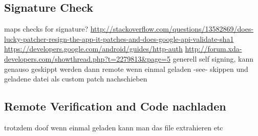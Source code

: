 \subsection{Signature Check} \label{subsection:tampering-signature}
maps checks for signature?\newline
\url{http://stackoverflow.com/questions/13582869/does-lucky-patcher-resign-the-app-it-patches-and-does-google-api-validate-sha1}\newline
\url{https://developers.google.com/android/guides/http-auth}
\url{http://forum.xda-developers.com/showthread.php?t=2279813&page=5}\newline
generell\newline
self signing, kann genauso geskippt werden dann
remote\newline
wenn einmal geladen -see- skippen und geladene datei als custom patch nachschieben
\subsection{Remote Verification and Code nachladen} \label{subsection:external-remote}
trotzdem doof wenn einmal geladen kann man das file extrahieren etc
